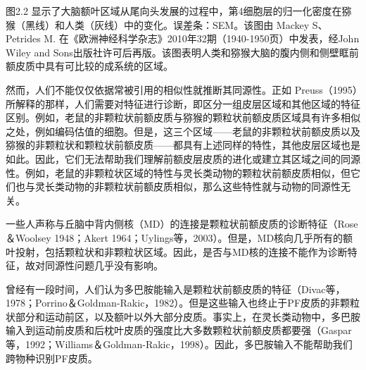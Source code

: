 图2.2 显示了大脑额叶区域从尾向头发展的过程中，第4细胞层的归一化密度在猕猴（黑线）和人类（灰线）中的变化。误差条：SEM。该图由 Mackey S、Petrides M. 在《欧洲神经科学杂志》2010年32期（1940-1950页）中发表，经John Wiley and Sons出版社许可后再版。该图表明人类和猕猴大脑的腹内侧和侧壁眶前额皮质中具有可比较的成系统的区域。

然而，人们不能仅仅依据常被引用的相似性就推断其同源性。正如 Preuss（1995）所解释的那样，人们需要对特征进行诊断，即区分一组皮层区域和其他区域的特征区别。例如，老鼠的非颗粒状前额皮质与猕猴的颗粒状前额皮质区域具有许多相似之处，例如编码估值的细胞。但是，这三个区域——老鼠的非颗粒状前额皮质以及猕猴的非颗粒状和颗粒状前额皮质——都具有上述同样的特性，其他皮层区域也是如此。因此，它们无法帮助我们理解前额皮层皮质的进化或建立其区域之间的同源性。例如，老鼠的非颗粒状区域的特性与灵长类动物的颗粒状前额皮质相似，但它们也与灵长类动物的非颗粒状前额皮质相似，那么这些特性就与动物的同源性无关。

一些人声称与丘脑中背内侧核（MD）的连接是颗粒状前额皮质的诊断特征（Rose＆Woolsey 1948；Akert 1964；Uylings等，2003）。但是，MD核向几乎所有的额叶投射，包括颗粒状和非颗粒状区域。因此，是否与MD核的连接不能作为诊断特征，故对同源性问题几乎没有影响。

曾经有一段时间，人们认为多巴胺能输入是颗粒状前额皮质的特征（Divac等，1978；Porrino＆Goldman-Rakic，1982）。但是这些输入也终止于PF皮质的非颗粒状部分和运动前区，以及额叶以外大部分皮质。事实上，在灵长类动物中，多巴胺输入到运动前皮质和后枕叶皮质的强度比大多数颗粒状前额皮质都要强（Gaspar等，1992；Williams＆Goldman-Rakic，1998）。因此，多巴胺输入不能帮助我们跨物种识别PF皮质。

